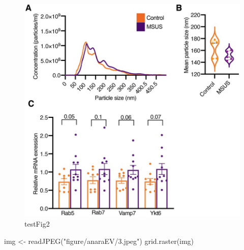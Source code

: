 \documentclass[12pt,twoside]{reedthesis}
\newenvironment{Shaded}{\begin{snugshade}}{\end{snugshade}}
\newcommand{\FunctionTok}[1]{\textcolor[rgb]{0.00,0.00,0.00}{#1}}
\newcommand{\NormalTok}[1]{#1}
\newcommand{\OtherTok}[1]{\textcolor[rgb]{0.56,0.35,0.01}{#1}}
\newcommand{\StringTok}[1]{\textcolor[rgb]{0.31,0.60,0.02}{#1}}
\begin{document}
\begin{figure}[H]

{\centering \includegraphics{thesis_files/figure-latex/fig2-1} 

}

\caption{testFig2}\label{fig:fig2}
\end{figure}
\begin{Shaded}
\begin{Highlighting}[]
\NormalTok{img }\OtherTok{\textless{}{-}} \FunctionTok{readJPEG}\NormalTok{(}\StringTok{"figure/anaraEV/3.jpeg"}\NormalTok{)}
\FunctionTok{grid.raster}\NormalTok{(img)}
\end{Highlighting}
\end{Shaded}
\end{document}
